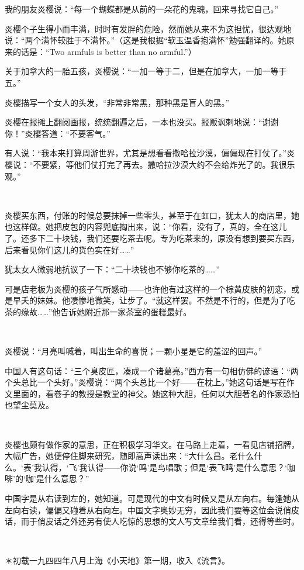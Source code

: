 \par 我的朋友炎樱说：“每一个蝴蝶都是从前的一朵花的鬼魂，回来寻找它自己。”
\par 炎樱个子生得小而丰满，时时有发胖的危险，然而她从来不为这担忧，很达观地说：“两个满怀较胜于不满怀。”（这是我根据“软玉温香抱满怀”勉强翻译的。她原来的话是：“Two armfuls is better than no armful.”）
\par 关于加拿大的一胎五孩，炎樱说：“一加一等于二，但是在加拿大，一加一等于五。”
\par 炎樱描写一个女人的头发，“非常非常黑，那种黑是盲人的黑。”
\par 炎樱在报摊上翻阅画报，统统翻遍之后，一本也没买。报贩讽刺地说：“谢谢你！”炎樱答道：“不要客气。”
\par 有人说：“我本来打算周游世界，尤其是想看看撒哈拉沙漠，偏偏现在打仗了。”炎樱说：“不要紧，等他们仗打完了再去。撒哈拉沙漠大约不会给炸光了的。我很乐观。”
\par  
\par 炎樱买东西，付账的时候总要抹掉一些零头，甚至于在虹口，犹太人的商店里，她也这样做。她把皮包的内容兜底掏出来，说：“你看，没有了，真的，全在这儿了。还多下二十块钱，我们还要吃茶去呢。专为吃茶来的，原没有想到要买东西，后来看见你们这儿的货色实在好……”
\par 犹太女人微弱地抗议了一下：“二十块钱也不够你吃茶的……”
\par 可是店老板为炎樱的孩子气所感动——也许他有过这样的一个棕黄皮肤的初恋，或是早夭的妹妹。他凄惨地微笑，让步了。“就这样罢。不然是不行的，但是为了吃茶的缘故……”他告诉她附近那一家茶室的蛋糕最好。
\par  
\par 炎樱说：“月亮叫喊着，叫出生命的喜悦；一颗小星是它的羞涩的回声。”
\par 中国人有这句话：“三个臭皮匠，凑成一个诸葛亮。”西方有一句相仿佛的谚语：“两个头总比一个头好。”炎樱说：“两个头总比一个好——在枕上。”她这句话是写在作文里面的，看卷子的教授是教堂的神父。她这种大胆，任何以大胆著名的作家恐怕也望尘莫及。
\par  
\par 炎樱也颇有做作家的意思，正在积极学习华文。在马路上走着，一看见店铺招牌，大幅广告，她便停住脚来研究，随即高声读出来：“大什么昌。老什么什么。‘表’我认得，‘飞’我认得——你说‘鸣’是鸟唱歌；但是‘表飞鸣’是什么意思？‘咖啡’的‘咖’是什么意思？”
\par 中国字是从右读到左的，她知道。可是现代的中文有时候又是从左向右。每逢她从左向右读，偏偏又碰着从右向左。中国文字奥妙无穷，因此我们要等这位会说俏皮话，而于俏皮话之外还另有使人吃惊的思想的文人写文章给我们看，还得等些时。
\par  
\par ＊初载一九四四年八月上海《小天地》第一期，收入《流言》。


